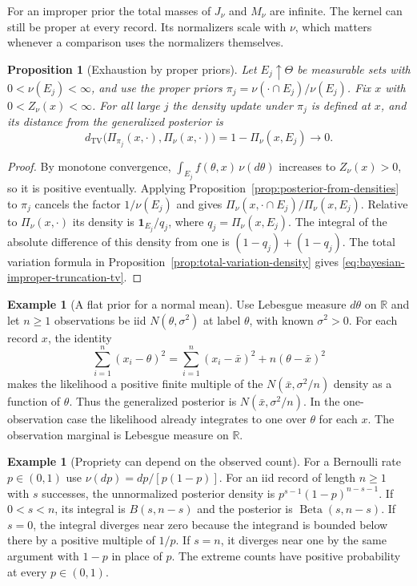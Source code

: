 \documentclass[11pt,oneside]{book}
\newtheorem{proposition}[theorem]{Proposition}
\theoremstyle{definition}
\newtheorem{example}[theorem]{Example}
\theoremstyle{remark}
\newcommand{\R}{\mathbb R}
\begin{document}
For an improper prior the total masses of $J_\nu$ and $M_\nu$
are infinite. The kernel can still be proper at every record.
Its normalizers scale with $\nu$, which matters whenever a
comparison uses the normalizers themselves.

\begin{proposition}[Exhaustion by proper priors]
\label{prop:bayesian-improper-prior-exhaustion}
Let $E_j\uparrow\Theta$ be measurable sets with
$0<\nu(E_j)<\infty$, and use the proper priors
$\pi_j=\nu(\cdot\cap E_j)/\nu(E_j)$. Fix $x$ with
$0<Z_\nu(x)<\infty$. For all large $j$ the density update
under $\pi_j$ is defined at $x$, and its distance from the
generalized posterior is
\begin{equation}
d_{\mathrm{TV}}\bigl(\Pi_{\pi_j}(x,\cdot),\Pi_\nu(x,\cdot)\bigr)
=1-\Pi_\nu(x,E_j)\longrightarrow 0.
\label{eq:bayesian-improper-truncation-tv}
\end{equation}
\end{proposition}
\begin{proof}
By monotone convergence, $\int_{E_j} f(\theta,x)\,\nu(d\theta)$
increases to $Z_\nu(x)>0$, so it is positive eventually.
Applying Proposition~\ref{prop:posterior-from-densities} to
$\pi_j$ cancels the factor $1/\nu(E_j)$ and gives
$\Pi_\nu(x,\cdot\cap E_j)/\Pi_\nu(x,E_j)$. Relative to
$\Pi_\nu(x,\cdot)$ its density is $\mathbf 1_{E_j}/q_j$,
where $q_j=\Pi_\nu(x,E_j)$. The integral of the absolute
difference of this density from one is $(1-q_j)+(1-q_j)$.
The total variation formula in Proposition~\ref{prop:total-variation-density}
gives \eqref{eq:bayesian-improper-truncation-tv}.
\end{proof}

\begin{example}[A flat prior for a normal mean]
\label{ex:bayesian-improper-flat-normal}
Use Lebesgue measure $d\theta$ on $\R$ and let $n\geq1$ observations
be iid $N(\theta,\sigma^2)$ at label $\theta$, with known $\sigma^2>0$.
For each record $x$, the identity
\[
\sum_{i=1}^n(x_i-\theta)^2
=\sum_{i=1}^n(x_i-\bar x)^2+n(\theta-\bar x)^2
\]
makes the likelihood a positive finite multiple of the
$N(\bar x,\sigma^2/n)$ density as a function of $\theta$.
Thus the generalized posterior is $N(\bar x,\sigma^2/n)$.
In the one-observation case the likelihood already integrates
to one over $\theta$ for each $x$. The observation marginal
is Lebesgue measure on $\R$.
\end{example}

\begin{example}[Propriety can depend on the observed count]
\label{ex:bayesian-improper-bernoulli-two-ends}
For a Bernoulli rate $p\in(0,1)$ use
$\nu(dp)=dp/[p(1-p)]$. For an iid record of length $n\geq1$
with $s$ successes, the unnormalized posterior density is
$p^{s-1}(1-p)^{n-s-1}$. If $0<s<n$, its integral is
$B(s,n-s)$ and the posterior is $\operatorname{Beta}(s,n-s)$.
If $s=0$, the integral diverges near zero because the integrand
is bounded below there by a positive multiple of $1/p$.
If $s=n$, it diverges near one by the same argument with
$1-p$ in place of $p$. The extreme counts have positive
probability at every $p\in(0,1)$.
\end{example}
\end{document}
